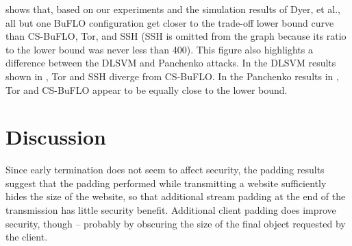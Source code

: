\documentclass[10pt,journal]{IEEEtran}
\newcommand{\buflo} {BuFLO\xspace}
\newcommand{\csb} {CS-BuFLO\xspace}
\begin{document}
 shows that, based on our experiments
and the simulation results of Dyer, et al., all but one \buflo
configuration get closer to the trade-off lower bound curve than \csb,
Tor, and SSH (SSH is omitted from the graph because its ratio to the
lower bound was never less than 400).  This figure also highlights a
difference between the DLSVM and Panchenko attacks.  In the DLSVM
results shown in , Tor and SSH diverge from
\csb.  In the Panchenko results in , Tor
and \csb appear to be equally close to the lower bound.

\begin{figure*}[t]
  \centering
  
  


  \caption{\label{fig:all-attacks-tradeoff-various} Non-uniform lower
    bounds on bandwidth ratio, as a function of the security
    parameter, , and specific trade-off points of the
    systems evaluated.  The \buflo results are taken from Dyer, et
    al.~\cite{dyer-snp12}, and therefore use .  SSH is omitted
    from  because its ratio to the lower
    bound was always greater than 400.}
\end{figure*}





\section{Discussion}
\label{sec:discussion}

Since early termination does not seem to affect security, the padding results
suggest that the padding performed while transmitting a website
sufficiently hides the size of the website, so that additional stream
padding at the end of the transmission has little security benefit.
Additional client padding does improve security, though -- probably by
obscuring the size of the final object requested by the client.
\end{document}
